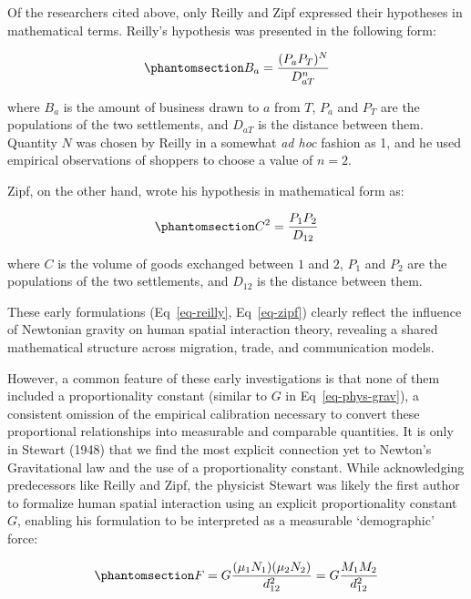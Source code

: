 \documentclass[
  10pt,
  letterpaper,
]{article}
\begin{document}
Of the researchers cited above, only Reilly and Zipf expressed their
hypotheses in mathematical terms. Reilly's hypothesis was presented in
the following form:

\begin{equation}\phantomsection\label{eq-reilly}{
B_a = \frac{(P_a P_T)^N}{D_{aT}^n}
}\end{equation}

\noindent where \(B_a\) is the amount of business drawn to \(a\) from
\(T\), \(P_a\) and \(P_T\) are the populations of the two settlements,
and \(D_{aT}\) is the distance between them. Quantity \(N\) was chosen
by Reilly in a somewhat \emph{ad hoc} fashion as 1, and he used
empirical observations of shoppers to choose a value of \(n = 2\).

Zipf, on the other hand, wrote his hypothesis in mathematical form as:

\begin{equation}\phantomsection\label{eq-zipf}{
C^2 = \frac{P_1 P_2}{D_{12}}
}\end{equation}

\noindent where \(C\) is the volume of goods exchanged between \(1\) and
\(2\), \(P_1\) and \(P_2\) are the populations of the two settlements,
and \(D_{12}\) is the distance between them.

These early formulations (Eq~\ref{eq-reilly}, Eq~\ref{eq-zipf}) clearly
reflect the influence of Newtonian gravity on human spatial interaction
theory, revealing a shared mathematical structure across migration,
trade, and communication models.

However, a common feature of these early investigations is that none of
them included a proportionality constant (similar to \(G\) in
Eq~\ref{eq-phys-grav}), a consistent omission of the empirical
calibration necessary to convert these proportional relationships into
measurable and comparable quantities. It is only in Stewart (1948)
\citep{stewartDemographicGravitationEvidence1948} that we find the most
explicit connection yet to Newton's Gravitational law and the use of a
proportionality constant. While acknowledging predecessors like Reilly
and Zipf, the physicist Stewart was likely the first author to formalize
human spatial interaction using an explicit proportionality constant
\(G\), enabling his formulation to be interpreted as a measurable
`demographic' force:

\begin{equation}\phantomsection\label{eq-stewart-force}{
F = G\frac{(\mu_1N_1)(\mu_2N_2)}{d_{12}^2} = G\frac{M_1 M_2}{d_{12}^2} 
}\end{equation}
\end{document}
